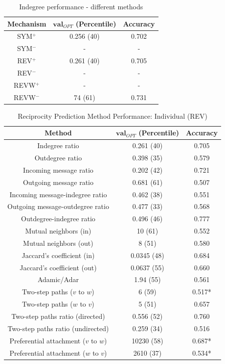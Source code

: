 \documentclass[conference]{IEEEtran}
\begin{document}
\begin{table}[!t]
\renewcommand{\arraystretch}{1.3}
\caption{Indegree performance - different methods}
\label{table_recresults_indeg}
\centering
\begin{tabular}{|c||c|c|}
\hline
\bf{Mechanism} & $\mathbf{val}_{OPT}$ (Percentile) & \bf{Accuracy} \\
\hline
SYM$^+$ & 0.256 (40) & 0.702 \\
SYM$^-$ & - & - \\
REV$^+$ & 0.261 (40) & 0.705 \\
REV$^-$ & - & - \\
REVW$^+$ & - & - \\
REVW$^-$ & 74 (61) & 0.731 \\
\hline
\end{tabular}
\end{table}

\begin{table}[!t]
\renewcommand{\arraystretch}{1.3}
\caption{Reciprocity Prediction Method Performance: Individual (REV)}
\label{table_recresults_indiv}
\centering
\begin{tabular}{|c||c|c|}
\hline
\bf{Method} & $\mathbf{val}_{OPT}$ (Percentile) & \bf{Accuracy} \\
\hline
Indegree ratio & 0.261 (40) & 0.705 \\
Outdegree ratio & 0.398 (35) & 0.579 \\
\hline
Incoming message ratio & 0.202 (42) & 0.721 \\
Outgoing message ratio & 0.681 (61) & 0.507 \\
\hline
Incoming message-indegree ratio & 0.462 (38) & 0.551 \\
Outgoing message-outdegree ratio & 0.477 (33) & 0.568 \\
\hline
Outdegree-indegree ratio & 0.496 (46) & 0.777 \\
\hline
Mutual neighbors (in) & 10 (61) & 0.552 \\
Mutual neighbors (out) & 8 (51) & 0.580 \\
\hline
Jaccard's coefficient (in) & 0.0345 (48) & 0.684 \\
Jaccard's coefficient (out) & 0.0637 (55) & 0.660 \\
\hline
Adamic/Adar & 1.94 (55) & 0.561 \\
\hline
Two-step paths ($v$ to $w$) & 6 (59) & 0.517* \\
Two-step paths ($w$ to $v$) & 5 (51) & 0.657 \\
Two-step paths ratio (directed) & 0.556 (52) & 0.760 \\
Two-step paths ratio (undirected) & 0.259 (34) & 0.516 \\
\hline
Preferential attachment ($v$ to $w$) & 10230 (58) & 0.687* \\
Preferential attachment ($w$ to $v$) & 2610 (37) & 0.534* \\
\hline
\end{tabular}
\end{table}
\end{document}
